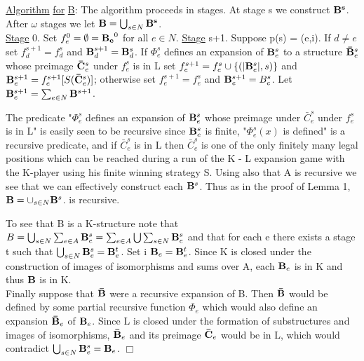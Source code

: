 \documentclass[twoside]{article}
\begin{document}
\underline{Algorithm} \underline{for} \underline{B}:   The algorithm proceeds in stages.   At stage s we construct $\mathbf{B^s}$.    After   $\omega$   stages we let   $\mathbf{B} = \bigcup_{s\in N} \mathbf{B^s}$.\\
\underline{Stage} 0.    Set $f_e^0 = \emptyset = \mathbf{B_e}^0$    for all $e\in N$.
\underline{Stage} s+1.   Suppose p(s) = (e,i). If $d\neq e$  set $f_d^{s+1} = f_d^s$ and $\mathbf{B}_d^{s+1}=\mathbf{B}_d^s$.   If $\Phi_e^s$
defines an expansion of $\mathbf{B}_e^s$  to a structure  $\mathbf{\bar{B}}_e^s$whose preimage $\mathbf{\bar{C}}_e^s$ under $f_e^s$   is in
L set $f_e^{s+1} = f_e^s \cup \{(|\mathbf{B}_e^s|,s)\}$ and $\mathbf{B}_e^{s+1} = f_e^{s+1}[S(\mathbf{\bar{C}}_e^s)]$; otherwise set $f_e^{s+1} = f_e^s$
and $\mathbf{B}_e^{s+1} = B_e^s$.    Let   $\mathbf{B}_e^{s+1} = \sum_{e\in N} \mathbf{B}^{s+1}$.


The predicate  "$\Phi_e^s$  defines an expansion of	$\mathbf{B}_e^s$ whose preimage under $\bar{C}_e^s$ under $f_e^s$ is in   L" is easily seen to be recursive since $\mathbf{B}_e^s$ is finite, "$\Phi_e^s(x)$ is defined" is a recursive predicate, and if $\bar{C}_e^s$   is in   L then $\bar{C}_e^s$   is one of the only finitely many legal positions which can be reached during a run of the K - L expansion game with the K-player using his finite winning strategy S. Using also that  A is recursive we see that we can effectively construct each $\mathbf{B}^s$.   Thus as in the proof of Lemma 1, $\mathbf{B} = \cup_{s\in N} \mathbf{B}^s$.   is recursive.
\newpage
%
%


To see that   B is a K-structure note that $B =  \bigcup_{s\in N} \sum_{e\in A} \mathbf{B}_e^s = \sum_{e\in A} \bigcup \sum_{s\in N} \mathbf{B}_e^s$ 
and that for each   e    there exists a stage    t such that $\bigcup_{s\in N} \mathbf{B}_e^s = \mathbf{B}_e^t$.    Set i $\mathbf{B}_e = \mathbf{B}_e^t$.    Since   K is closed under the construction of images of isomorphisms and
sums over   A, each  $\mathbf{B}_e$ is in   K and thus $\mathbf{B}$ is in K.\\
\indent Finally suppose that $\mathbf{\bar{B}}$ were a recursive expansion of B. Then $\mathbf{\bar{B}}$ would be
defined by some partial recursive function $\Phi_e$ which would also define an
expansion $\mathbf{\bar{B}}_e$   of $\mathbf{B}_e$. Since L is closed under the formation of substructures and images of isomorphisms, $\mathbf{\bar{B}}_e$ and its preimage $\mathbf{\bar{C}}_e$     would be in L, which would
contradict   $\bigcup_{s\in N} \mathbf{B}_e^s = \mathbf{B}_e$. $\Box$\\
\end{document}
